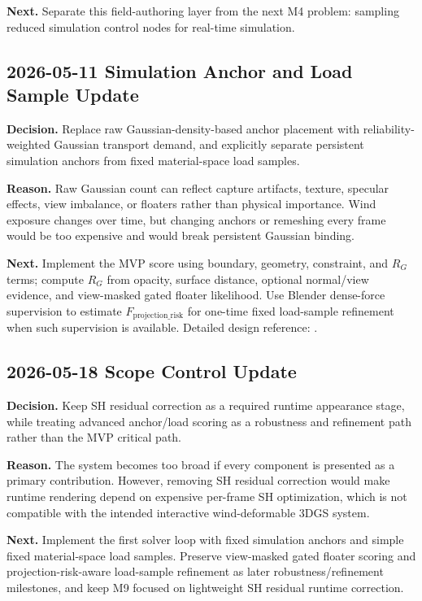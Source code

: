 \documentclass[11pt]{article}
\begin{document}
\textbf{Next.} Separate this field-authoring layer from the next M4 problem: sampling reduced simulation control nodes for real-time simulation.

\subsection*{2026-05-11 Simulation Anchor and Load Sample Update}

\textbf{Decision.} Replace raw Gaussian-density-based anchor placement with reliability-weighted Gaussian transport demand, and explicitly separate persistent simulation anchors from fixed material-space load samples.

\textbf{Reason.} Raw Gaussian count can reflect capture artifacts, texture, specular effects, view imbalance, or floaters rather than physical importance. Wind exposure changes over time, but changing anchors or remeshing every frame would be too expensive and would break persistent Gaussian binding.

\textbf{Next.} Implement the MVP score using boundary, geometry, constraint, and \(R_G\) terms; compute \(R_G\) from opacity, surface distance, optional normal/view evidence, and view-masked gated floater likelihood. Use Blender dense-force supervision to estimate \(F_{\mathrm{projection\_risk}}\) for one-time fixed load-sample refinement when such supervision is available. Detailed design reference: .

\subsection*{2026-05-18 Scope Control Update}

\textbf{Decision.} Keep SH residual correction as a required runtime appearance stage, while treating advanced anchor/load scoring as a robustness and refinement path rather than the MVP critical path.

\textbf{Reason.} The system becomes too broad if every component is presented as a primary contribution. However, removing SH residual correction would make runtime rendering depend on expensive per-frame SH optimization, which is not compatible with the intended interactive wind-deformable 3DGS system.

\textbf{Next.} Implement the first solver loop with fixed simulation anchors and simple fixed material-space load samples. Preserve view-masked gated floater scoring and projection-risk-aware load-sample refinement as later robustness/refinement milestones, and keep M9 focused on lightweight SH residual runtime correction.



\end{document}
